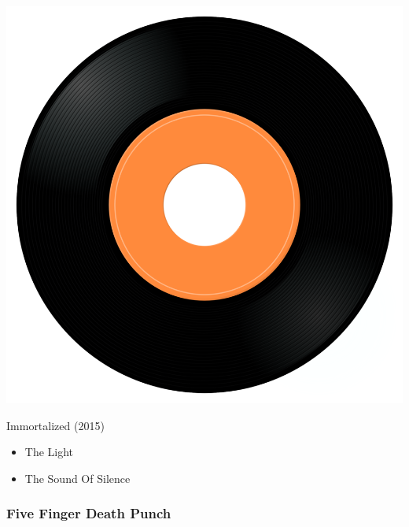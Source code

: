 \begin{minipage}[t]{0.25\textwidth}
\captionsetup{type=figure}
\includegraphics[width=\textwidth]{Images/cover.png}
\caption*{Immortalized (2015)}
\end{minipage}
\begin{minipage}[t]{0.25\textwidth}\vspace{0pt}
\begin{itemize}[nosep,leftmargin=1em,labelwidth=*,align=left]
	\setlength{\itemsep}{0pt}
	\item The Light
	\item The Sound Of Silence
\end{itemize}
\end{minipage}

\subsubsection{Five Finger Death Punch}

